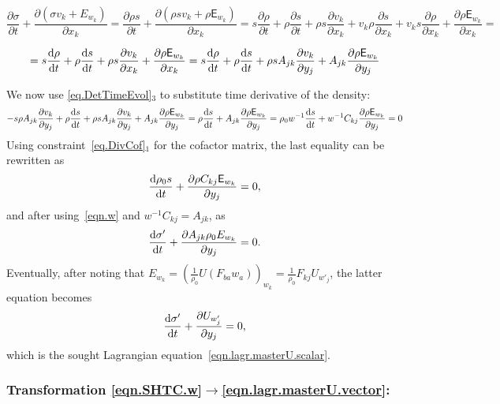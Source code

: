 \documentclass[twoside]{article}
\newcommand{\ted}{E} %
\newcommand{\tes}{\mathsf{E}} %
\newcommand{\pd}{\partial}
\begin{document}
\[\frac{\pd \sigma}{\pd t}+\frac{\pd \left( 
\sigma v_k+\ted_{w_k}\right)}{\pd x_k}=\frac{\pd \rho   s }{\pd t}+\frac{\pd 
\left(\rho  
 s v_k+\rho  \tes_{w_k}\right)}{\pd x_k}=
s \frac{\pd \rho }{\pd t}+\rho \frac{\pd  s }{\pd 
t}+\rho   s \frac{\pd v_k}{\pd x_k}+v_k\rho \frac{\pd  s }{\pd
x_k}+v_k s \frac{\pd \rho }{\pd x_k}+\frac{\pd \rho  
\tes_{w_k}}{\pd x_k}=\]

\[{=s \frac{{\rm d} \rho }{{\rm d} t}+\rho \frac{{\rm d}  s }{{\rm 
d} t}+\rho   s 
\frac{\pd
v_k}{\pd x_k}+\frac{\pd \rho  \tes_{w_k}}{\pd x_k}=s \frac{{\rm d} \rho 
}{{\rm d} t}+\rho \frac{{\rm d}  s }{{\rm d} t}+\rho   s A_{j k}\frac{\pd 
v_k}{\pd
y_j}+A_{j k}\frac{\pd \rho  \tes_{w_k}}{\pd y_j}}\]


We now use \eqref{eq.DetTimeEvol}$ _3 $ to substitute time derivative of the 
density:
\[
{- s \rho  A_{j k}\frac{\pd v_k}{\pd y_j}+\rho \frac{{\rm d}  s }{{\rm d} 
t}+\rho   s A_{j k}\frac{\pd v_k}{\pd y_j}+A_{j k}\frac{\pd
\rho  \tes_{w_k}}{\pd y_j}=\rho \frac{{\rm d}  s }{{\rm d} t}+A_{j k}\frac{\pd 
\rho  
\tes_{w_k}}{\pd y_j}=\rho _0w^{-1}\frac{{\rm d}  s }{{\rm d} t}+w^{-1}C_{k 
j}\frac{\pd
\rho  \tes_{w_k}}{\pd y_j}=0}
\]
Using constraint~\eqref{eq.DivCof}$ _1 $ for the cofactor matrix, the last 
equality can be rewritten as
\[\frac{{\rm d} \rho_0  s }{{\rm d} t}+\frac{\pd \rho C_{kj} \tes_{w_k}}{\pd 
y_j}=0,\]
and after using~\eqref{eqn.w} and $ w^{-1} C_{kj} = A_{jk} $, as
\[\frac{{\rm d} \sigma' }{{\rm d} t}+\frac{\pd A_{jk} \rho_0 \ted_{w_k}}{\pd 
y_j}=0.\]
Eventually, after noting that $ \ted_{w_k}= \left 
(\frac{1}{\rho_0}U(F_{ba}w_{a})\right )_{w_k} 
= \frac{1}{\rho_0} F_{kj} U_{w'_j}$, 
the latter equation becomes
\begin{equation}\label{eqn.scalar.final}
\frac{{\rm d} \sigma'}{{\rm d} t}+\frac{\pd U_{w'_j}}{\pd y_j}=0,
\end{equation}
which is the sought Lagrangian equation~\eqref{eqn.lagr.masterU.scalar}.

\subsubsection{Transformation \eqref{eqn.SHTC.w}$ \rightarrow 
$\eqref{eqn.lagr.masterU.vector}:}
\end{document}
